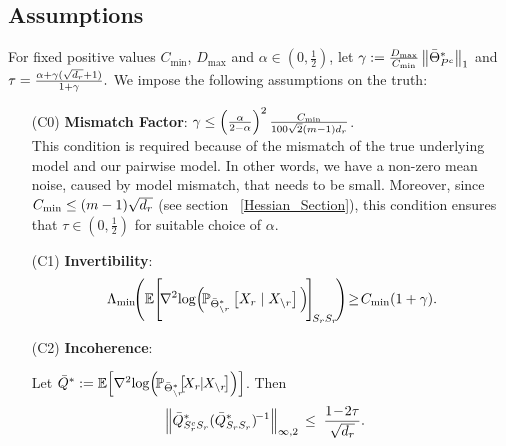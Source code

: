 \subsection{Assumptions}
For fixed positive values $C_{\min}$, $D_{\max}$ and $\alpha\in\left(0,\frac{1}{2}\right)$, let $\gamma:=\frac{D_{\max}}{C_{\min}}\left\|\bar{\Theta}^*_{P^c}\right\|_{1}$ and $\tau=\frac{\alpha+\gamma(\sqrt{d_{r}}+1)}{1+\gamma}.$ We impose the following assumptions on the truth:
\begin{itemize}
\item [(C0)] {\bf Mismatch Factor}: $\gamma\leq\left(\frac{\alpha}{2-\alpha}\right)^2\frac{C_{\min}}{100\sqrt{2}(m-1) d_{r}}$.\\

This condition is required because of the mismatch of the true underlying model and our pairwise model. In other words, we have a non-zero mean noise, caused by model mismatch, that needs to be small. Moreover, since $C_{\min}\leq (m-1)\sqrt{d_{r}}$ (see section ~\ref{Hessian_Section}), this condition ensures that $\tau\in\left(0,\frac{1}{2}\right)$ for suitable choice of $\alpha$.

\item [(C1)] {\bf Invertibility}: \footnotesize$$\Lambda_{\min}\!\Biggr(\mathbb{E}\Bigg[\!\nabla^2\!\log\!\Big(\!\mathbb{P}_{\bar{\Theta}^*_{\backslash\svert}}\left[X_\svert\mid X_{\backslash\svert}\right]\Big)\!\Bigg]_{\!\support_\svert\support_\svert}\!\Biggr)\!\geq\! C_{\min}(1+\gamma).$$\normalsize

\item [(C2)] {\bf Incoherence}: 

Let $\bar{\fisher}^* := \mathbb{E}\!\left[\nabla^2\!\log\!\Big(\!\mathbb{P}_{\bar{\Theta}^*_{\backslash\svert}} \!\!\!\left[\!X_\svert\!\!\mid\!\!X_{\backslash\svert}\!\right]\!\Big)\right]$. Then
\begin{align*}
\left\|\bar{Q}^*_{S_{r}^cS_{r}} (\bar{Q}^*_{S_{r}S_{r}})^{\!-1}\right\|_{\infty,2}\, &\leq \; \frac{1\!-\!2\tau}{\sqrt{d_{r}}}.
\end{align*}



\end{itemize}

